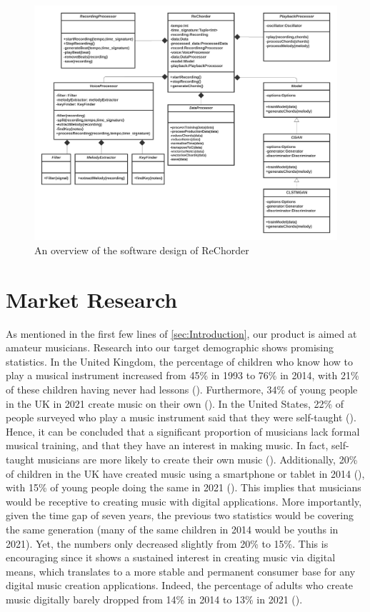 \begin{figure}
    \centering
    \includegraphics[width=\columnwidth]{Figures/SoftwareOverview}
    \decoRule
    \caption[]{An overview of the software design of ReChorder}
    \label{fig:SoftwareOverview}
\end{figure}

\section{Market Research}
\label{marketresearch}
As mentioned in the first few lines of \cref{sec:Introduction}, our product is aimed at amateur musicians. Research into our target demographic shows promising statistics. In the United Kingdom, the percentage of children who know how to play a musical instrument increased from 45\% in 1993 to 76\% in 2014, with 21\% of these children having never had lessons (\cite{abrsm2014}). Furthermore, 34\% of young people in the UK in 2021 create music on their own (\cite{abrsm2021}). In the United States, 22\% of people surveyed who play a music instrument said that they were self-taught (\cite{gallup2003}). Hence, it can be concluded that a significant proportion of musicians lack formal musical training, and that they have an interest in making music. In fact, self-taught musicians are more likely to create their own music (\cite{compareguitarpiano}). Additionally, 20\% of children in the UK have created music using a smartphone or tablet in 2014 (\cite{abrsm2014}), with 15\% of young people doing the same in 2021 (\cite{abrsm2021}). This implies that musicians would be receptive to creating music with digital applications. More importantly, given the time gap of seven years, the previous two statistics would be covering the same generation (many of the same children in 2014 would be youths in 2021). Yet, the numbers only decreased slightly from 20\% to 15\%. This is encouraging since it shows a sustained interest in creating music via digital means, which translates to a more stable and permanent consumer base for any digital music creation applications. Indeed, the percentage of adults who create music digitally barely dropped from 14\% in 2014 to 13\% in 2021 (\cite{abrsm2021}).
 
